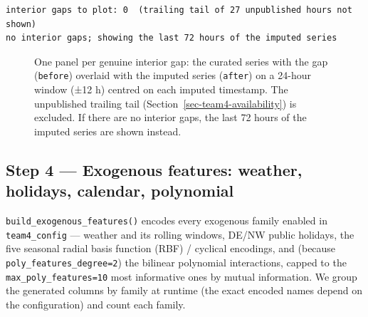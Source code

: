 \documentclass[
  english,
  letterpaper,
]{scrbook}
\begin{document}
\begin{verbatim}
interior gaps to plot: 0  (trailing tail of 27 unpublished hours not shown)
no interior gaps; showing the last 72 hours of the imputed series
\end{verbatim}

\begin{figure}


\caption{\label{fig-team4-imputation}One panel per genuine interior gap:
the curated series with the gap (\texttt{before}) overlaid with the
imputed series (\texttt{after}) on a 24-hour window (±12 h) centred on
each imputed timestamp. The unpublished trailing tail
(Section~\ref{sec-team4-availability}) is excluded. If there are no
interior gaps, the last 72 hours of the imputed series are shown
instead.}

\end{figure}%

\subsection{Step 4 --- Exogenous features: weather, holidays, calendar,
polynomial}\label{sec-team4-exog}

\texttt{build\_exogenous\_features()} encodes every exogenous family
enabled in \texttt{team4\_config} --- weather and its rolling windows,
DE/NW public holidays, the five seasonal radial basis function (RBF) /
cyclical encodings, and (because \texttt{poly\_features\_degree=2}) the
bilinear polynomial interactions, capped to the
\texttt{max\_poly\_features=10} most informative ones by mutual
information. We group the generated columns by family at runtime (the
exact encoded names depend on the configuration) and count each family.
\end{document}
